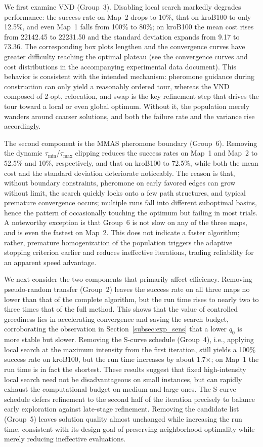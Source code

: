 We first examine VND (Group~3). Disabling local search markedly degrades performance: the success rate on Map~2 drops to 10\%, that on kroB100 to only 12.5\%, and even Map~1 falls from 100\% to 80\%; on kroB100 the mean cost rises from 22142.45 to 22231.50 and the standard deviation expands from 9.17 to 73.36. The corresponding box plots lengthen and the convergence curves have greater difficulty reaching the optimal plateau (see the convergence curves and cost distributions in the accompanying experimental data document). This behavior is consistent with the intended mechanism: pheromone guidance during construction can only yield a reasonably ordered tour, whereas the VND composed of 2-opt, relocation, and swap is the key refinement step that drives the tour toward a local or even global optimum. Without it, the population merely wanders around coarser solutions, and both the failure rate and the variance rise accordingly.

The second component is the MMAS pheromone boundary (Group~6). Removing the dynamic $\tau_{\min}$/$\tau_{\max}$ clipping reduces the success rates on Map~1 and Map~2 to 52.5\% and 10\%, respectively, and that on kroB100 to 72.5\%, while both the mean cost and the standard deviation deteriorate noticeably. The reason is that, without boundary constraints, pheromone on early favored edges can grow without limit, the search quickly locks onto a few path structures, and typical premature convergence occurs; multiple runs fall into different suboptimal basins, hence the pattern of occasionally touching the optimum but failing in most trials. A noteworthy exception is that Group~6 is not slow on any of the three maps, and is even the fastest on Map~2. This does not indicate a faster algorithm; rather, premature homogenization of the population triggers the adaptive stopping criterion earlier and reduces ineffective iterations, trading reliability for an apparent speed advantage.

We next consider the two components that primarily affect efficiency. Removing pseudo-random transfer (Group~2) leaves the success rate on all three maps no lower than that of the complete algorithm, but the run time rises to nearly two to three times that of the full method. This shows that the value of controlled greediness lies in accelerating convergence and saving the search budget, corroborating the observation in Section~\textcolor{blue}{\ref{subsec:exp_sens}} that a lower $q_0$ is more stable but slower. Removing the S-curve schedule (Group~4), i.e., applying local search at the maximum intensity from the first iteration, still yields a 100\% success rate on kroB100, but the run time increases by about 1.7$\times$; on Map~1 the run time is in fact the shortest. These results suggest that fixed high-intensity local search need not be disadvantageous on small instances, but can rapidly exhaust the computational budget on medium and large ones. The S-curve schedule defers refinement to the second half of the iteration precisely to balance early exploration against late-stage refinement. Removing the candidate list (Group~5) leaves solution quality almost unchanged while increasing the run time, consistent with its design goal of preserving neighborhood optimality while merely reducing ineffective evaluations.

